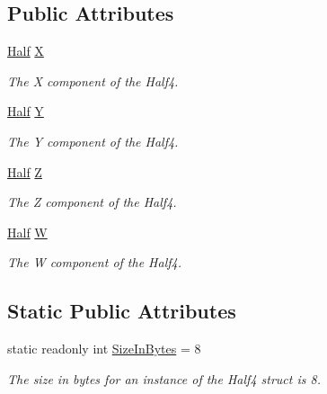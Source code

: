 \subsection*{Public Attributes}
\begin{DoxyCompactItemize}
\item 
\hyperlink{struct_open_t_k_1_1_half}{Half} \hyperlink{struct_open_t_k_1_1_vector4h_aa7ae413a8ced899b4a0a6a110fafbbbd}{X}
\begin{DoxyCompactList}\small\item\em The X component of the Half4.\end{DoxyCompactList}\item 
\hyperlink{struct_open_t_k_1_1_half}{Half} \hyperlink{struct_open_t_k_1_1_vector4h_af81d236d00aa897f580cb3a4032ab49a}{Y}
\begin{DoxyCompactList}\small\item\em The Y component of the Half4.\end{DoxyCompactList}\item 
\hyperlink{struct_open_t_k_1_1_half}{Half} \hyperlink{struct_open_t_k_1_1_vector4h_a03730091c433636727986a4e104dfa9a}{Z}
\begin{DoxyCompactList}\small\item\em The Z component of the Half4.\end{DoxyCompactList}\item 
\hyperlink{struct_open_t_k_1_1_half}{Half} \hyperlink{struct_open_t_k_1_1_vector4h_a6a2fb7b9fd8ad55ad2ba7aca511636fb}{W}
\begin{DoxyCompactList}\small\item\em The W component of the Half4.\end{DoxyCompactList}\end{DoxyCompactItemize}
\subsection*{Static Public Attributes}
\begin{DoxyCompactItemize}
\item 
static readonly int \hyperlink{struct_open_t_k_1_1_vector4h_a2e494b3420662fcf722e78ca24961017}{Size\-In\-Bytes} = 8
\begin{DoxyCompactList}\small\item\em The size in bytes for an instance of the Half4 struct is 8.\end{DoxyCompactList}\end{DoxyCompactItemize}
